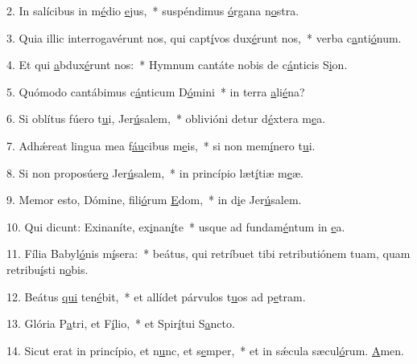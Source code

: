 2. In salícibus in m\uline{é}dio \uline{e}jus,~* suspéndimus \uline{ó}rgana n\uline{o}stra.\par 
3. Quia illic interrogavérunt nos, qui capt\uline{í}vos dux\uline{é}runt nos,~* verba c\uline{a}nti\uline{ó}num.\par 
4. Et qui \uline{a}bdux\uline{é}runt nos:~* Hymnum cantáte nobis de c\uline{á}nticis S\uline{i}on.\par 
5. Quómodo cantábimus c\uline{á}nticum D\uline{ó}mini~* in terra \uline{a}li\uline{é}na?\par 
6. Si oblítus fúero t\uline{u}i, Jer\uline{ú}salem,~* oblivióni detur d\uline{é}xtera m\uline{e}a.\par 
7. Adhǽreat lingua mea f\uline{áu}cibus m\uline{e}is,~* si non mem\uline{í}nero t\uline{u}i.\par 
8. Si non proposúer\uline{o} Jer\uline{ú}salem,~* in princípio læt\uline{í}tiæ m\uline{e}æ.\par 
9. Memor esto, Dómine, fili\uline{ó}rum \uline{E}dom,~* in d\uline{i}e Jer\uline{ú}salem.\par 
10. Qui dicunt: Exinaníte, ex\uline{i}nan\uline{í}te~* usque ad fundam\uline{é}ntum in \uline{e}a.\par 
11. Fília Babyl\uline{ó}nis m\uline{í}sera:~* beátus, qui retríbuet tibi retributiónem tuam, quam retribu\uline{í}sti n\uline{o}bis.\par 
12. Beátus \uline{qui} ten\uline{é}bit,~* et allídet párvulos t\uline{u}os ad p\uline{e}tram.\par 
13. Glória P\uline{a}tri, et F\uline{í}lio,~* et Spir\uline{í}tui S\uline{a}ncto.\par 
14. Sicut erat in princípio, et n\uline{u}nc, et s\uline{e}mper,~* et in sǽcula sæcul\uline{ó}rum. \uline{A}men.\par 

